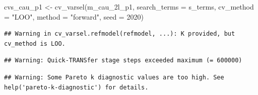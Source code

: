 \documentclass[
]{article}
\newenvironment{Shaded}{\begin{snugshade}}{\end{snugshade}}
\newcommand{\AttributeTok}[1]{\textcolor[rgb]{0.77,0.63,0.00}{#1}}
\newcommand{\DecValTok}[1]{\textcolor[rgb]{0.00,0.00,0.81}{#1}}
\newcommand{\FunctionTok}[1]{\textcolor[rgb]{0.00,0.00,0.00}{#1}}
\newcommand{\NormalTok}[1]{#1}
\newcommand{\OtherTok}[1]{\textcolor[rgb]{0.56,0.35,0.01}{#1}}
\newcommand{\StringTok}[1]{\textcolor[rgb]{0.31,0.60,0.02}{#1}}
\begin{document}
\begin{Shaded}
\begin{Highlighting}[]
\NormalTok{cvs\_cau\_p1 }\OtherTok{\textless{}{-}} \FunctionTok{cv\_varsel}\NormalTok{(m\_cau\_2l\_p1, }
                        \AttributeTok{search\_terms =}\NormalTok{ s\_terms, }
                        \AttributeTok{cv\_method =} \StringTok{"LOO"}\NormalTok{, }\AttributeTok{method =} \StringTok{"forward"}\NormalTok{,}
                        \AttributeTok{seed =} \DecValTok{2020}\NormalTok{)}
\end{Highlighting}
\end{Shaded}

\begin{verbatim}
## Warning in cv_varsel.refmodel(refmodel, ...): K provided, but cv_method is LOO.
\end{verbatim}

\begin{verbatim}
## Warning: Quick-TRANSfer stage steps exceeded maximum (= 600000)
\end{verbatim}

\begin{verbatim}
## Warning: Some Pareto k diagnostic values are too high. See help('pareto-k-diagnostic') for details.
\end{verbatim}
\end{document}
